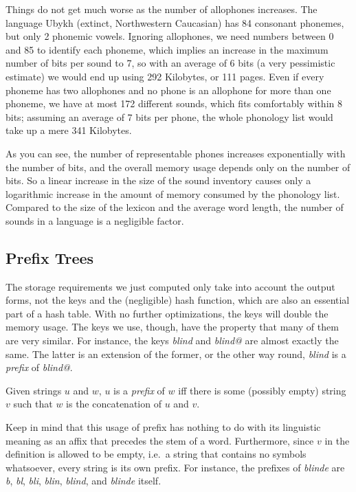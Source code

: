 Things do not get much worse as the number of allophones increases.
The language Ubykh (extinct, Northwestern Caucasian) has 84 consonant phonemes, but only 2 phonemic vowels.
Ignoring allophones, we need numbers between 0 and 85 to identify each phoneme, which implies an increase in the maximum number of bits per sound to 7, so with an average of 6 bits (a very pessimistic estimate) we would end up using 292 Kilobytes, or 111 pages.
Even if every phoneme has two allophones and no phone is an allophone for more than one phoneme, we have at most 172 different sounds, which fits comfortably within 8 bits; assuming an average of 7 bits per phone, the whole phonology list would take up a mere 341 Kilobytes.

As you can see, the number of representable phones increases exponentially with the number of bits, and the overall memory usage depends only on the number of bits. 
So a linear increase in the size of the sound inventory causes only a logarithmic increase in the amount of memory consumed by the phonology list.
Compared to the size of the lexicon and the average word length, the number of sounds in a language is a negligible factor.

\subsection{Prefix Trees}

The storage requirements we just computed only take into account the output forms, not the keys and the (negligible) hash function, which are also an essential part of a hash table.
With no further optimizations, the keys will double the memory usage.
The keys we use, though, have the property that many of them are very similar.
For instance, the keys \emph{blind} and \emph{blind@} are almost exactly the same.
The latter is an extension of the former, or the other way round, \emph{blind} is a \emph{prefix} of \emph{blind@}.
%
\begin{definition}[Prefix]
    Given strings $u$ and $w$, $u$ is a \emph{prefix} of $w$ iff there is some (possibly empty) string $v$ such that $w$ is the concatenation of $u$ and $v$.
\end{definition}
%
Keep in mind that this usage of prefix has nothing to do with its linguistic meaning as an affix that precedes the stem of a word.
Furthermore, since $v$ in the definition is allowed to be empty, i.e.\ a string that contains no symbols whatsoever, every string is its own prefix.
For instance, the prefixes of \emph{blinde} are \emph{b}, \emph{bl}, \emph{bli}, \emph{blin}, \emph{blind}, and \emph{blinde} itself.

